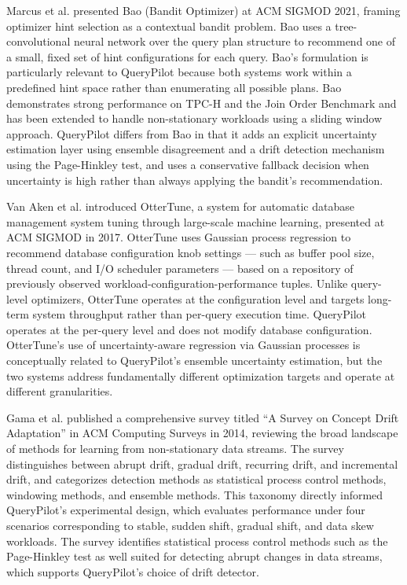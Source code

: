 Marcus et al. \cite{marcus2021bao} presented Bao (Bandit Optimizer) at ACM
SIGMOD 2021, framing optimizer hint selection as a contextual bandit problem.
Bao uses a tree-convolutional neural network over the query plan structure to
recommend one of a small, fixed set of hint configurations for each query.
Bao's formulation is particularly relevant to QueryPilot because both systems
work within a predefined hint space rather than enumerating all possible plans.
Bao demonstrates strong performance on TPC-H and the Join Order Benchmark and
has been extended to handle non-stationary workloads using a sliding window
approach. QueryPilot differs from Bao in that it adds an explicit uncertainty
estimation layer using ensemble disagreement and a drift detection mechanism
using the Page-Hinkley test, and uses a conservative fallback decision when
uncertainty is high rather than always applying the bandit's recommendation.

Van Aken et al. \cite{vanaken2017ottertune} introduced OtterTune, a system for
automatic database management system tuning through large-scale machine
learning, presented at ACM SIGMOD in 2017. OtterTune uses Gaussian process
regression to recommend database configuration knob settings --- such as buffer
pool size, thread count, and I/O scheduler parameters --- based on a repository
of previously observed workload-configuration-performance tuples. Unlike
query-level optimizers, OtterTune operates at the configuration level and
targets long-term system throughput rather than per-query execution time.
QueryPilot operates at the per-query level and does not modify database
configuration. OtterTune's use of uncertainty-aware regression via Gaussian
processes is conceptually related to QueryPilot's ensemble uncertainty
estimation, but the two systems address fundamentally different optimization
targets and operate at different granularities.

Gama et al. \cite{gama2014survey} published a comprehensive survey titled ``A
Survey on Concept Drift Adaptation'' in ACM Computing Surveys in 2014,
reviewing the broad landscape of methods for learning from non-stationary data
streams. The survey distinguishes between abrupt drift, gradual drift,
recurring drift, and incremental drift, and categorizes detection methods as
statistical process control methods, windowing methods, and ensemble methods.
This taxonomy directly informed QueryPilot's experimental design, which
evaluates performance under four scenarios corresponding to stable, sudden
shift, gradual shift, and data skew workloads. The survey identifies
statistical process control methods such as the Page-Hinkley test as well
suited for detecting abrupt changes in data streams, which supports
QueryPilot's choice of drift detector.

